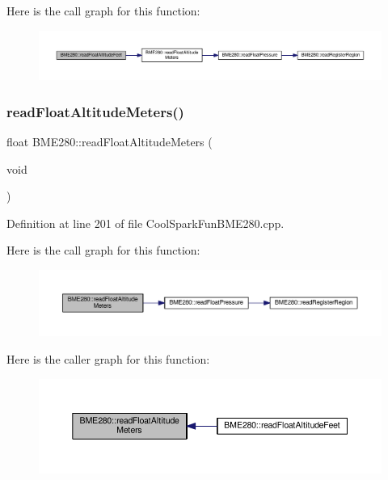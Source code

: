 Here is the call graph for this function\+:\nopagebreak
\begin{figure}[H]
\begin{center}
\leavevmode
\includegraphics[width=350pt]{class_b_m_e280_a6525c8a26f887b52596c86bed99343cb_cgraph}
\end{center}
\end{figure}
\mbox{\label{class_b_m_e280_af67b56ba50760ee1d116acc6c5010221}} 
\subsubsection{\texorpdfstring{read\+Float\+Altitude\+Meters()}{readFloatAltitudeMeters()}}
{\footnotesize\ttfamily float B\+M\+E280\+::read\+Float\+Altitude\+Meters (\begin{DoxyParamCaption}\item[{void}]{ }\end{DoxyParamCaption})}



Definition at line 201 of file Cool\+Spark\+Fun\+B\+M\+E280.\+cpp.

Here is the call graph for this function\+:\nopagebreak
\begin{figure}[H]
\begin{center}
\leavevmode
\includegraphics[width=350pt]{class_b_m_e280_af67b56ba50760ee1d116acc6c5010221_cgraph}
\end{center}
\end{figure}
Here is the caller graph for this function\+:\nopagebreak
\begin{figure}[H]
\begin{center}
\leavevmode
\includegraphics[width=350pt]{class_b_m_e280_af67b56ba50760ee1d116acc6c5010221_icgraph}
\end{center}
\end{figure}
\mbox{\label{class_b_m_e280_a42ea7232039eebf5aadb391ef6132c35}} 
